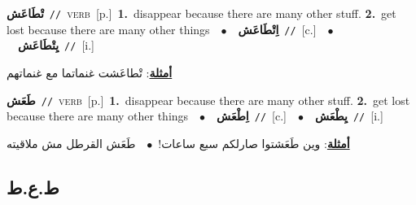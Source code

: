 \documentclass[10pt,a4paper,twoside]{article} %
\begin{document}
\begin{multicols}{2}
{\setlength\topsep{0pt}\textbf{\foreignlanguage{arabic}{تْطَاعَش}}\ {\color{gray}\texttt{//}\color{black}}\ \textsc{verb}\ [p.]\ \textbf{1.}~disappear because there are many other stuff.  \textbf{2.}~get lost because there are many other things\ \ $\bullet$\ \ \setlength\topsep{0pt}\textbf{\foreignlanguage{arabic}{اِتْطَاعَش}}\ {\color{gray}\texttt{//}\color{black}}\ [c.]\ \ $\bullet$\ \ \setlength\topsep{0pt}\textbf{\foreignlanguage{arabic}{يِتْطَاعَش}}\ {\color{gray}\texttt{//}\color{black}}\ [i.]\  \begin{flushright}\color{gray}\foreignlanguage{arabic}{\textbf{\underline{\foreignlanguage{arabic}{أمثلة}}}: تْطاعَشت غنماتما مع غنماتهم}\end{flushright}\color{black}} \vspace{2mm}

{\setlength\topsep{0pt}\textbf{\foreignlanguage{arabic}{طَعَش}}\ {\color{gray}\texttt{//}\color{black}}\ \textsc{verb}\ [p.]\ \textbf{1.}~disappear because there are many other stuff.  \textbf{2.}~get lost because there are many other things\ \ $\bullet$\ \ \setlength\topsep{0pt}\textbf{\foreignlanguage{arabic}{اِطْعَش}}\ {\color{gray}\texttt{//}\color{black}}\ [c.]\ \ $\bullet$\ \ \setlength\topsep{0pt}\textbf{\foreignlanguage{arabic}{يِطْعَش}}\ {\color{gray}\texttt{//}\color{black}}\ [i.]\  \begin{flushright}\color{gray}\foreignlanguage{arabic}{\textbf{\underline{\foreignlanguage{arabic}{أمثلة}}}: وين طَعَشتوا صارلكم سبع ساعات!\ $\bullet$\ \  طَعَش القرطل مش ملاقيته}\end{flushright}\color{black}} \vspace{2mm}

\vspace{-3mm}
\subsection*{\color{blue}\foreignlanguage{arabic}{ط.ع.ط}\color{blue}{}} 


\end{multicols}
\end{document}
